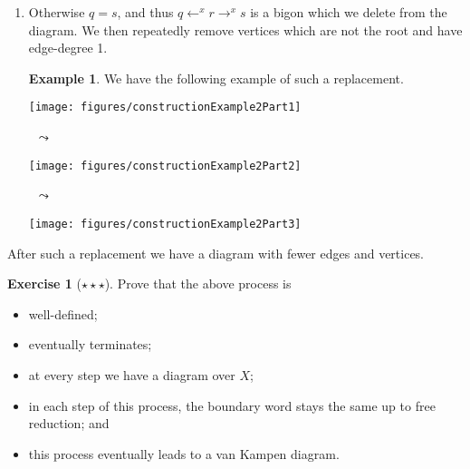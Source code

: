 \documentclass[11pt,a4paper,reqno]{amsart}
\theoremstyle{plain}
\theoremstyle{definition}
\theoremstyle{definition}
\newtheorem{exercise}[theorem]{Exercise}
\newtheorem{example}[theorem]{Example}
\newcommand\exerciseLevelHard{$\star${\,}$\star${\,}$\star$}
\begin{document}
\begin{enumerate}
\begin{enumerate}
\begin{example}
		            \end{example}

		            \smallskip

		      \item Otherwise $q = s$, and thus $q \leftarrow^{x} r \to^x s$ is a bigon which we delete from the diagram.
		            We then repeatedly remove vertices which are not the root and have edge-degree 1.

		            \smallskip

		            \begin{example}
			            We have the following example of such a replacement.

			            \smallskip

			            \begin{center}
				            \begin{minipage}{.3\linewidth}
					            \centering
					            \texttt{[image: figures/constructionExample2Part1]}%
				            \end{minipage}
				            ~{\Large$\leadsto$}~
				            \begin{minipage}{.2\linewidth}
					            \centering
					            \texttt{[image: figures/constructionExample2Part2]}%
				            \end{minipage}
				            ~{\Large$\leadsto$}~
				            \begin{minipage}{.2\linewidth}
					            \centering
					            \texttt{[image: figures/constructionExample2Part3]}%
				            \end{minipage}
			            \end{center}

		            \end{example}
	      \end{enumerate}
	      \noindent
	      After such a replacement we have a diagram with fewer edges and vertices.
\end{enumerate}

\begin{exercise}[\exerciseLevelHard]\label{ex:van-kampen-construct}
	Prove that the above process is
	\begin{itemize}
		\item well-defined; \item eventually terminates; \item at every step we have a diagram over $X$; \item in each step of this process, the boundary word stays the same up to free reduction; and \item this process eventually leads to a van Kampen diagram.
	\end{itemize}
\end{exercise}
\end{document}
